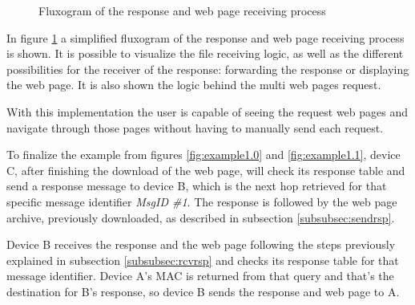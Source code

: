 \begin{figure}[ht]
   \noindent{}
	\caption{\label{fig:rsprcvflux} Fluxogram of the response and web page receiving process}
\end{figure}

In figure \ref{fig:rsprcvflux} a simplified fluxogram of the response and web page receiving process is shown. It is possible to visualize the file receiving logic, as well as the different possibilities for the receiver of the response: forwarding the response or displaying the web page. It is also shown the logic behind the multi web pages request.

With this implementation the user is capable of seeing the request web pages and navigate through those pages without having to manually send each request.

To finalize the example from figures \ref{fig:example1.0} and \ref{fig:example1.1}, device C, after finishing the download of the web page, will check its response table and send a response message to device B, which is the next hop retrieved for that specific message identifier \textit{MsgID \#1}. The response is followed by the web page archive, previously downloaded, as described in subsection \ref{subsubsec:sendrsp}.

Device B receives the response and the web page following the steps previously explained in subsection \ref{subsubsec:rcvrsp} and checks its response table for that message identifier. Device A's \gls{MAC} is returned from that query and that's the destination for B's response, so device B sends the response and web page to A.

